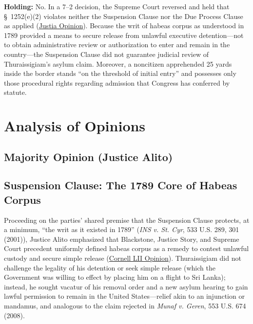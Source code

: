 \documentclass[12pt]{article}
\begin{document}
\textbf{Holding:} No. In a 7--2 decision, the Supreme Court reversed and held that \S\ 1252(e)(2) violates neither the Suspension Clause nor the Due Process Clause as applied (\href{https://supreme.justia.com/cases/federal/us/591/19-161/}{Justia Opinion}). Because the writ of habeas corpus as understood in 1789 provided a means to secure release from unlawful executive detention---not to obtain administrative review or authorization to enter and remain in the country---the Suspension Clause did not guarantee judicial review of Thuraissigiam's asylum claim. Moreover, a noncitizen apprehended 25 yards inside the border stands ``on the threshold of initial entry'' and possesses only those procedural rights regarding admission that Congress has conferred by statute.

\section{Analysis of Opinions}
\subsection{Majority Opinion (Justice Alito)}

\subsection{Suspension Clause: The 1789 Core of Habeas Corpus}
Proceeding on the parties' shared premise that the Suspension Clause protects, at a minimum, ``the writ as it existed in 1789'' (\textit{INS v. St. Cyr}, 533 U.S. 289, 301 (2001)), Justice Alito emphasized that Blackstone, Justice Story, and Supreme Court precedent uniformly defined habeas corpus as a remedy to contest unlawful custody and secure simple release (\href{https://www.law.cornell.edu/supremecourt/text/19-161}{Cornell LII Opinion}). Thuraissigiam did not challenge the legality of his detention or seek simple release (which the Government was willing to effect by placing him on a flight to Sri Lanka); instead, he sought vacatur of his removal order and a new asylum hearing to gain lawful permission to remain in the United States---relief akin to an injunction or mandamus, and analogous to the claim rejected in \textit{Munaf v. Geren}, 553 U.S. 674 (2008).
\end{document}
